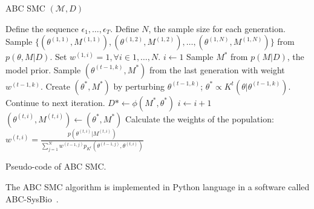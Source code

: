 \begin{algorithm}[h]
\textsc{ABC SMC} $(\mathcal{M}, D)$
\begin{algorithmic}[1]
    \State Define the sequence $\epsilon_1, \ldots, \epsilon_T$.
    \State Define $N$, the sample size for each generation. 
    \State Sample $\{(\theta^{(1, 1)}, M^{(1, 1)}), 
                     (\theta^{(1, 2)}, M^{(1, 2)}), \ldots, 
                     (\theta^{(1, N)}, M^{(1, N)})\}$ from 
                     $p (\theta, M| D)$.
    \State Set $w^{(1, i)} = 1, \forall i \in {1, \ldots, N}$.  
        \State $i \gets 1$
            \State Sample $M^*$ from $p (M | D)$, the model prior.
            \State Sample $(\theta^{(t - 1, k)}, M^*)$ from the 
                last generation with weight $w^{(t - 1, k)}$.
            \State Create $(\theta^*, M^*)$ by perturbing 
                $\theta^{(t - 1, k)}$; 
                $\theta^* \propto K^t(\theta | \theta^{(t - 1, k)})$.
                \State Continue to next iteration.
            \EndIf
            \State $D* \gets \phi (M^*, \theta^*)$
                \State $i \gets i + 1$
                \State $(\theta^{(t, i)}, M^{(t, i)}) \gets 
                    (\theta^*, M^*)$
            \EndIf
        \EndWhile
        \State Calculate the weights of the population:
$                w^{(t, i)} = \frac{p (\theta^{(t, i)} | M^{(t, i)})}
                         {\sum_{j = 1}^N w^{(t-1, j)}p_{K^t}
                            (\theta^{(t-1, j)}, \theta^{(t, i)})}$
    \EndFor
    \Return
\end{algorithmic}
\caption{Pseudo-code of ABC SMC.}
\label{code:abc_smc}
\end{algorithm}
The ABC SMC algorithm is implemented in Python language in a software called 
ABC-SysBio~\cite{Liepe2014}.


